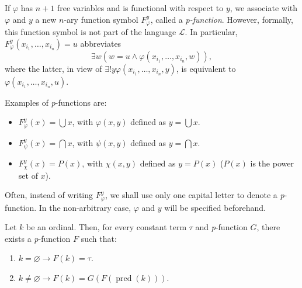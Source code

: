 \begin{definition}
    \label{def:pFunc}
    \leanok
    If $\varphi$ has $n+1$ free variables and is functional with respect to $y$, 
    we associate with $\varphi$ and $y$ a new $n$-ary function symbol $F_\varphi^y$, 
    called a \textit{p-function}. 
    However, formally, this function symbol is not part of the language $\mathcal{L}$. 
    In particular, $F_\varphi^y(x_{i_1},\ldots,x_{i_n})=u$ abbreviates
    $$
    \exists w (w = u \land \varphi (x_{i_1},\ldots,x_{i_n},w)),
    $$
    where the latter, in view of $\exists! y \varphi (x_{i_1},\ldots,x_{i_n},y)$, 
    is equivalent to $\varphi (x_{i_1},\ldots,x_{i_n},u)$.

    Examples of \textit{p}-functions are:
    \begin{itemize}
        \item $F_\varphi^y(x) = \bigcup x$, with $\varphi(x,y)$ defined as $y = \bigcup x$.
        \item $F_\psi^y(x) = \bigcap x$, with $\psi(x,y)$ defined as $y = \bigcap x$.
        \item $F_\chi^y(x) = P (x)$, with $\chi(x,y)$ defined as $y = P (x)$
        ($P(x)$ is the power set of $x$).
    \end{itemize}

    Often, instead of writing $F_\varphi^y$, we shall use only one capital letter to 
    denote a \textit{p}-function. 
    In the non-arbitrary case, $\varphi$ and $y$ will be specified beforehand.
\end{definition}

\begin{theorem}
    \label{thm:Ord.exists_pFuncRecursive}
    Let $k$ be an ordinal. Then, for every constant term $\tau$ and \textit{p}-function $G$,
    there exists a \textit{p}-function $F$ such that:
    \begin{enumerate}
        \item $k=\varnothing \rightarrow F(k) = \tau$.
        \item $k\neq \varnothing \rightarrow F(k) = G(F(\operatorname{pred}(k)))$.
    \end{enumerate}
\end{theorem}

